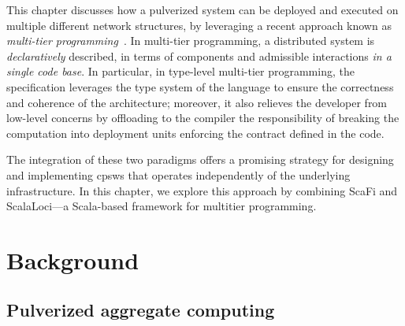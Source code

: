 This chapter discusses how a pulverized system can be deployed and executed on multiple different network structures,
 by leveraging a recent approach known as \emph{multi-tier programming}~\cite{DBLP:journals/csur/WeisenburgerWS20}.
%
In multi-tier programming, 
 a distributed system is \emph{declaratively} described, 
 in terms of components and admissible interactions \emph{in a single code base}.
%
In particular, in type-level multi-tier programming, 
 the specification leverages the type system of the language to ensure the correctness and coherence of the architecture;
moreover, 
 it also relieves the developer from low-level concerns 
 by offloading to the compiler
 the responsibility of breaking the computation into deployment units %
 enforcing the contract defined in the code.
%

The integration of these two paradigms offers a promising strategy for designing and implementing \acp{cpsw} 
 that operates independently of the underlying infrastructure. 
 In this chapter, we explore this approach by combining ScaFi and ScalaLoci---a Scala-based framework for multitier programming.
\section{Background}
\label{background}
\subsection{Pulverized aggregate computing}

